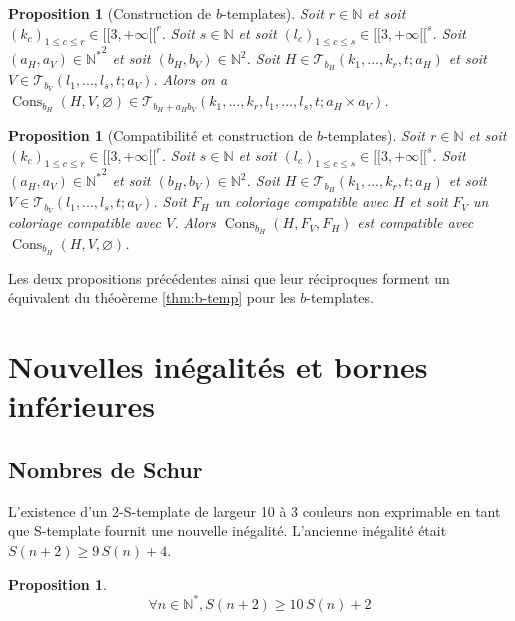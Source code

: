 \documentclass{article}
\newtheorem{proposition}[definition]{Proposition}
\DeclareMathOperator{\cons}{Cons}
\begin{document}
\begin{proposition}[Construction de \(b\)-templates]
Soit \(r \in \mathbb{N}\) et soit \((k_c)_{1 \leqslant c \leqslant r} \in {[\![3, +\infty[\![}^r\). Soit \(s \in \mathbb{N}\) et soit \((l_c)_{1 \leqslant c \leqslant s} \in {[\![3, +\infty[\![}^s\). Soit \((a_H, a_V) \in {\mathbb{N}^*}^2\) et soit \((b_H, b_V) \in \mathbb{N}^2\). Soit \(H \in \mathcal{T}_{b_H}(k_1, ..., k_r, t; a_H)\) et soit \(V \in \mathcal{T}_{b_V}(l_1, ..., l_s, t; a_V)\). Alors on a \(\cons_{b_H}(H, V, \varnothing) \in \mathcal{T}_{b_H + a_H b_V}(k_1, ..., k_r, l_1, ..., l_s, t; a_H \times a_V)\).
\end{proposition}

\begin{proposition}[Compatibilité et construction de \(b\)-templates]
Soit \(r \in \mathbb{N}\) et soit \((k_c)_{1 \leqslant c \leqslant r} \in {[\![3, +\infty[\![}^r\). Soit \(s \in \mathbb{N}\) et soit \((l_c)_{1 \leqslant c \leqslant s} \in {[\![3, +\infty[\![}^s\). Soit \((a_H, a_V) \in {\mathbb{N}^*}^2\) et soit \((b_H, b_V) \in \mathbb{N}^2\). Soit \(H \in \mathcal{T}_{b_H}(k_1, ..., k_r, t; a_H)\) et soit \(V \in \mathcal{T}_{b_V}(l_1, ..., l_s, t; a_V)\). Soit \(F_H\) un coloriage compatible avec \(H\) et  soit \(F_V\) un coloriage compatible avec \(V\).
Alors \(\cons_{b_H}(H, F_V, F_H)\) est compatible avec \(\cons_{b_H}(H, V, \varnothing)\).
\end{proposition}

Les deux propositions précédentes ainsi que leur réciproques forment un équivalent du théoèreme \ref{thm:b-temp} pour les \(b\)-templates.

\section{Nouvelles inégalités et bornes inférieures}
\label{sec:results}

\subsection{Nombres de Schur}

L'existence d'un 2-S-template de largeur 10 à 3 couleurs non exprimable en tant que S-template fournit une nouvelle inégalité. L'ancienne inégalité était \(S(n + 2) \geqslant 9 \, S(n) + 4\).

\begin{proposition}
	\[\forall n \in \mathbb{N}^*, S(n + 2) \geqslant 10 \, S(n) + 2\]
\end{proposition}
\end{document}
